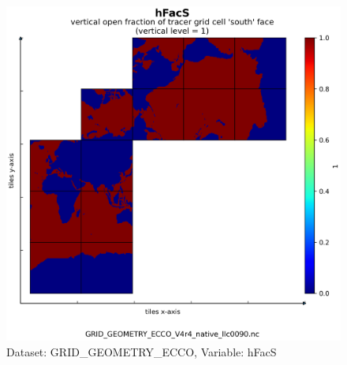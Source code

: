 \begin{figure}[H]
\centering
\includegraphics[scale=0.55]{../images/plots/native_plots_coords/Geometry_Parameters_for_the_Lat-Lon-Cap_90_(llc90)_Native_Model_Grid_(Version_4_Release_4)/hFacS.png}
\caption{Dataset: GRID\_GEOMETRY\_ECCO, Variable: hFacS}
\label{tab:table-GRID_GEOMETRY_ECCO_hFacS-Plot}
\end{figure}
\newpage
\pagebreak
